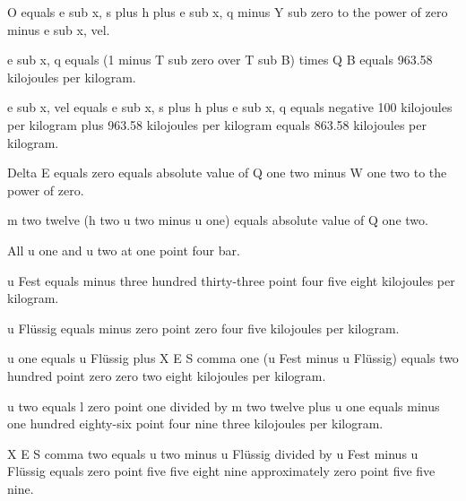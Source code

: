 O equals e sub x, s plus h plus e sub x, q minus Y sub zero to the power of zero minus e sub x, vel.  

e sub x, q equals (1 minus T sub zero over T sub B) times Q B equals 963.58 kilojoules per kilogram.  

e sub x, vel equals e sub x, s plus h plus e sub x, q equals negative 100 kilojoules per kilogram plus 963.58 kilojoules per kilogram equals 863.58 kilojoules per kilogram.

Delta E equals zero equals absolute value of Q one two minus W one two to the power of zero.

m two twelve (h two u two minus u one) equals absolute value of Q one two.

All u one and u two at one point four bar.

u Fest equals minus three hundred thirty-three point four five eight kilojoules per kilogram.

u Flüssig equals minus zero point zero four five kilojoules per kilogram.

u one equals u Flüssig plus X E S comma one (u Fest minus u Flüssig) equals two hundred point zero zero two eight kilojoules per kilogram.

u two equals l zero point one divided by m two twelve plus u one equals minus one hundred eighty-six point four nine three kilojoules per kilogram.

X E S comma two equals u two minus u Flüssig divided by u Fest minus u Flüssig equals zero point five five eight nine approximately zero point five five nine.